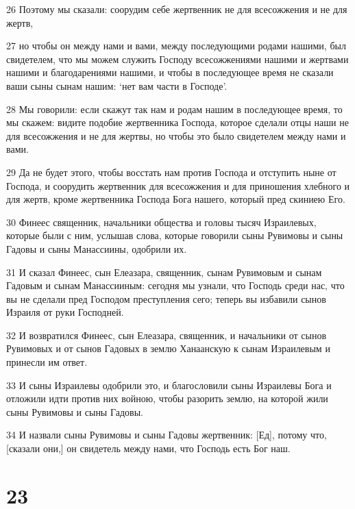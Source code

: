 \par 26 Поэтому мы сказали: соорудим себе жертвенник не для всесожжения и не для жертв,
\par 27 но чтобы он между нами и вами, между последующими родами нашими, был свидетелем, что мы можем служить Господу всесожжениями нашими и жертвами нашими и благодарениями нашими, и чтобы в последующее время не сказали ваши сыны сынам нашим: `нет вам части в Господе'.
\par 28 Мы говорили: если скажут так нам и родам нашим в последующее время, то мы скажем: видите подобие жертвенника Господа, которое сделали отцы наши не для всесожжения и не для жертвы, но чтобы это было свидетелем между нами и вами.
\par 29 Да не будет этого, чтобы восстать нам против Господа и отступить ныне от Господа, и соорудить жертвенник для всесожжения и для приношения хлебного и для жертв, кроме жертвенника Господа Бога нашего, который пред скиниею Его.
\par 30 Финеес священник, начальники общества и головы тысяч Израилевых, которые были с ним, услышав слова, которые говорили сыны Рувимовы и сыны Гадовы и сыны Манассиины, одобрили их.
\par 31 И сказал Финеес, сын Елеазара, священник, сынам Рувимовым и сынам Гадовым и сынам Манассииным: сегодня мы узнали, что Господь среди нас, что вы не сделали пред Господом преступления сего; теперь вы избавили сынов Израиля от руки Господней.
\par 32 И возвратился Финеес, сын Елеазара, священник, и начальники от сынов Рувимовых и от сынов Гадовых в землю Ханаанскую к сынам Израилевым и принесли им ответ.
\par 33 И сыны Израилевы одобрили это, и благословили сыны Израилевы Бога и отложили идти против них войною, чтобы разорить землю, на которой жили сыны Рувимовы и сыны Гадовы.
\par 34 И назвали сыны Рувимовы и сыны Гадовы жертвенник: [Ед], потому что, [сказали они,] он свидетель между нами, что Господь есть Бог наш.

\chapter{23}


